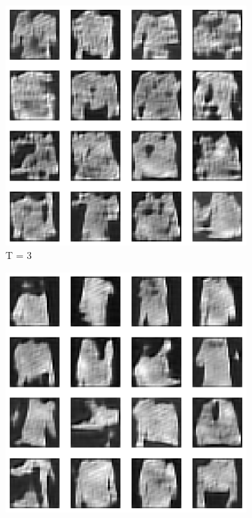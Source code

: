 \documentclass{article}
\begin{document}
\begin{figure}[H]
	\begin{subfigure}[h]{0.3\linewidth}
		\centering
		\includegraphics[scale=0.3]{../code/generated_DDGAN_tv_3.png}
		\caption{T = 3}
	\end{subfigure}
	\hfill
	\begin{subfigure}[h]{0.3\linewidth}
		\centering
		\includegraphics[scale=0.3]{../code/generated_DDGAN_tv_5.png}

\end{subfigure}
\end{figure}
\end{document}
